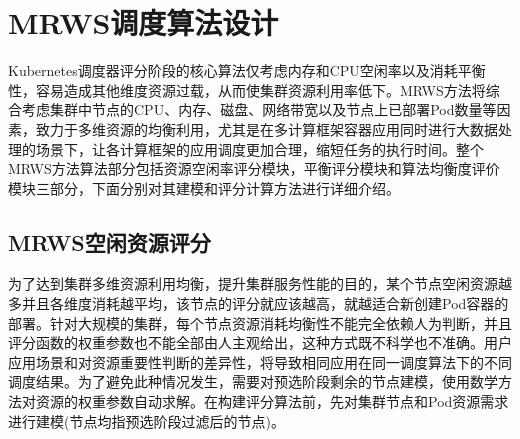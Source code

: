 \section{MRWS调度算法设计}
Kubernetes调度器评分阶段的核心算法仅考虑内存和CPU空闲率以及消耗平衡性，容易造成其他维度资源过载，从而使集群资源利用率低下。MRWS方法将综合考虑集群中节点的CPU、内存、磁盘、网络带宽以及节点上已部署Pod数量等因素，致力于多维资源的均衡利用，尤其是在多计算框架容器应用同时进行大数据处理的场景下，让各计算框架的应用调度更加合理，缩短任务的执行时间。整个MRWS方法算法部分包括资源空闲率评分模块，平衡评分模块和算法均衡度评价模块三部分，下面分别对其建模和评分计算方法进行详细介绍。

\subsection{MRWS空闲资源评分}
为了达到集群多维资源利用均衡，提升集群服务性能的目的，某个节点空闲资源越多并且各维度消耗越平均，该节点的评分就应该越高，就越适合新创建Pod容器的部署。针对大规模的集群，每个节点资源消耗均衡性不能完全依赖人为判断，并且评分函数的权重参数也不能全部由人主观给出，这种方式既不科学也不准确。用户应用场景和对资源重要性判断的差异性，将导致相同应用在同一调度算法下的不同调度结果。为了避免此种情况发生，需要对预选阶段剩余的节点建模，使用数学方法对资源的权重参数自动求解。在构建评分算法前，先对集群节点和Pod资源需求进行建模(节点均指预选阶段过滤后的节点)。
